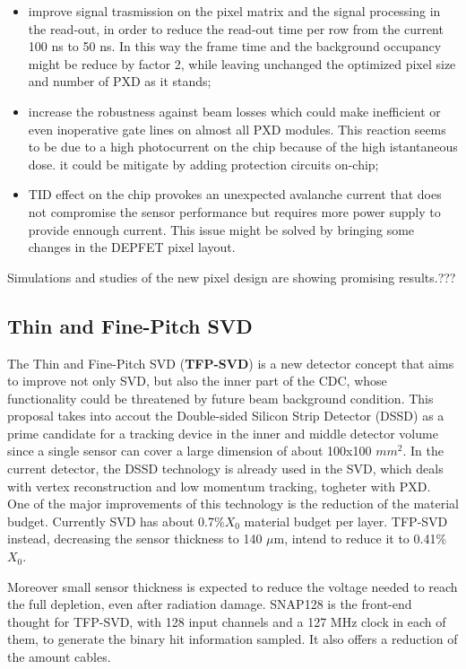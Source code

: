 \begin{itemize}
\item improve signal trasmission on the pixel matrix and the signal processing in the read-out, in order to reduce the read-out time per row from the current 100 ns to 50 ns. In this way the frame time and the background occupancy might be reduce by factor 2, while leaving unchanged the optimized pixel size and number of PXD as it stands;
\item increase the robustness against beam losses which could make inefficient or even inoperative gate lines on almost all PXD modules. This reaction seems to be due to a high photocurrent on the chip because of the high istantaneous dose. it could be mitigate by adding protection circuits on-chip;
\item TID effect on the chip provokes an unexpected avalanche current that does not compromise the sensor performance but requires more power supply to provide ennough current. This issue might be solved by bringing some changes in the DEPFET pixel layout.
\end{itemize}

Simulations and studies of the new pixel design are showing promising results.???


\subsection{Thin and Fine-Pitch SVD}

The Thin and Fine-Pitch SVD (\textbf{TFP-SVD}) is a new detector concept that aims to improve not only SVD, but also the inner part of the CDC, whose functionality could be threatened by future beam background condition.
This proposal takes into accout the Double-sided Silicon Strip Detector (DSSD) as a prime candidate for a tracking device in the inner and middle detector volume since a single sensor can cover a large dimension of about 100x100 $mm^{2}$. In the current detector, the DSSD technology is already used in the SVD, which deals with vertex reconstruction and low momentum tracking, togheter with PXD.\\

One of the major improvements of this technology is the reduction of the material budget.
Currently SVD has about 0.7\%$X_{0}$ material budget per layer. TFP-SVD instead, decreasing the sensor thickness to 140 $\mu$m, intend to reduce it to 0.41\%$X_{0}$. 

Moreover small sensor thickness is expected to reduce the voltage needed to reach the full depletion, even after radiation damage. 
SNAP128 is the front-end thought for TFP-SVD, with 128 input channels and a 127 MHz clock in each of them, to generate the binary hit information sampled. It also offers a reduction of the amount cables.

